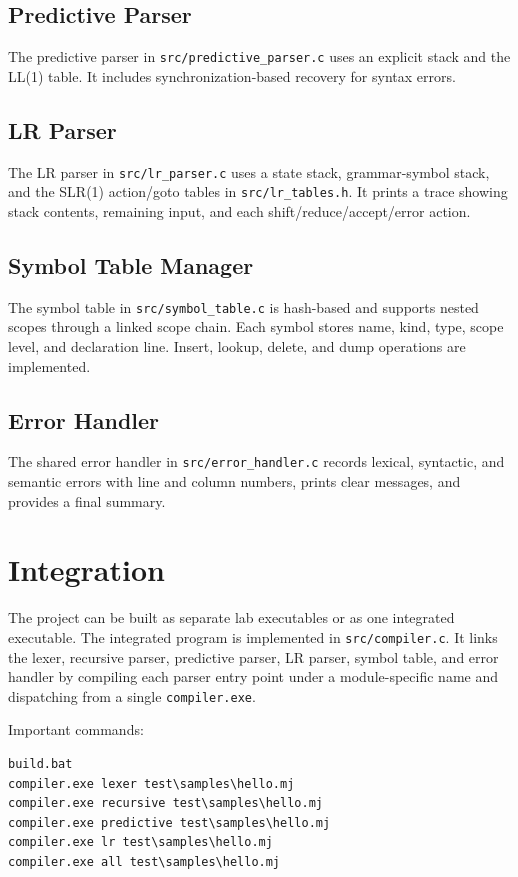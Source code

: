 \documentclass[12pt,a4paper]{article}
\begin{document}
\subsection{Predictive Parser}
The predictive parser in \texttt{src/predictive\_parser.c} uses an explicit stack and the LL(1) table. It includes synchronization-based recovery for syntax errors.

\subsection{LR Parser}
The LR parser in \texttt{src/lr\_parser.c} uses a state stack, grammar-symbol stack, and the SLR(1) action/goto tables in \texttt{src/lr\_tables.h}. It prints a trace showing stack contents, remaining input, and each shift/reduce/accept/error action.

\subsection{Symbol Table Manager}
The symbol table in \texttt{src/symbol\_table.c} is hash-based and supports nested scopes through a linked scope chain. Each symbol stores name, kind, type, scope level, and declaration line. Insert, lookup, delete, and dump operations are implemented.

\subsection{Error Handler}
The shared error handler in \texttt{src/error\_handler.c} records lexical, syntactic, and semantic errors with line and column numbers, prints clear messages, and provides a final summary.

\section{Integration}

The project can be built as separate lab executables or as one integrated executable. The integrated program is implemented in \texttt{src/compiler.c}. It links the lexer, recursive parser, predictive parser, LR parser, symbol table, and error handler by compiling each parser entry point under a module-specific name and dispatching from a single \texttt{compiler.exe}.

Important commands:
\begin{verbatim}
build.bat
compiler.exe lexer test\samples\hello.mj
compiler.exe recursive test\samples\hello.mj
compiler.exe predictive test\samples\hello.mj
compiler.exe lr test\samples\hello.mj
compiler.exe all test\samples\hello.mj
\end{verbatim}
\end{document}
